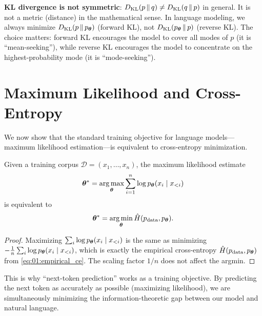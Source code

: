 \begin{warningbox}
\textbf{KL divergence is not symmetric}: $D_{\mathrm{KL}}\!\left(p \,\|\, q\right) \neq D_{\mathrm{KL}}\!\left(q \,\|\, p\right)$ in general. It is not a metric (distance) in the mathematical sense. In language modeling, we always minimize $D_{\mathrm{KL}}\!\left(p \,\|\, p_{\boldsymbol{\theta}}\right)$ (forward KL), not $D_{\mathrm{KL}}\!\left(p_{\boldsymbol{\theta}} \,\|\, p\right)$ (reverse KL). The choice matters: forward KL encourages the model to cover all modes of $p$ (it is ``mean-seeking''), while reverse KL encourages the model to concentrate on the highest-probability mode (it is ``mode-seeking'').
\end{warningbox}


\section{Maximum Likelihood and Cross-Entropy}
\label{ch:01:sec:mle}

We now show that the standard training objective for language models---maximum likelihood estimation---is equivalent to cross-entropy minimization.

\begin{proposition}[MLE = Cross-entropy minimization]
\label{prop:01:mle_ce}
Given a training corpus $\mathcal{D} = (x_1, \ldots, x_n)$, the maximum likelihood estimate
\begin{equation}
\boldsymbol{\theta}^* = \operatorname*{arg\,max}_{\boldsymbol{\theta}} \sum_{i=1}^n \log p_{\boldsymbol{\theta}}(x_i \mid x_{<i})
\end{equation}
is equivalent to
\begin{equation}
\boldsymbol{\theta}^* = \operatorname*{arg\,min}_{\boldsymbol{\theta}} \hat{H}(p_{\text{data}}, p_{\boldsymbol{\theta}}).
\end{equation}
\end{proposition}

\begin{proof}
Maximizing $\sum_i \log p_{\boldsymbol{\theta}}(x_i \mid x_{<i})$ is the same as minimizing $-\frac{1}{n}\sum_i \log p_{\boldsymbol{\theta}}(x_i \mid x_{<i})$, which is exactly the empirical cross-entropy $\hat{H}(p_{\text{data}}, p_{\boldsymbol{\theta}})$ from \cref{eq:01:empirical_ce}. The scaling factor $1/n$ does not affect the argmin.
\end{proof}

\begin{keyinsight}
This is why ``next-token prediction'' works as a training objective. By predicting the next token as accurately as possible (maximizing likelihood), we are simultaneously minimizing the information-theoretic gap between our model and natural language.
\end{keyinsight}


